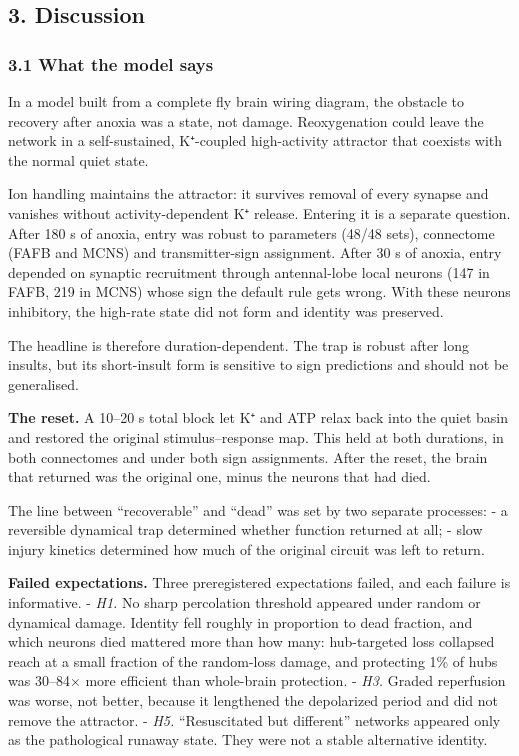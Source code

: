 \documentclass[11pt]{article}
\begin{document}
\subsection{3. Discussion}\label{discussion}

\subsubsection{3.1 What the model says}\label{what-the-model-says}

In a model built from a complete fly brain wiring diagram, the obstacle to recovery after anoxia was a state, not damage. Reoxygenation could leave the network in a self-sustained, K⁺-coupled high-activity attractor that coexists with the normal quiet state.

Ion handling maintains the attractor: it survives removal of every synapse and vanishes without activity-dependent K⁺ release. Entering it is a separate question. After 180 s of anoxia, entry was robust to parameters (48/48 sets), connectome (FAFB and MCNS) and transmitter-sign assignment. After 30 s of anoxia, entry depended on synaptic recruitment through antennal-lobe local neurons (147 in FAFB, 219 in MCNS) whose sign the default rule gets wrong. With these neurons inhibitory, the high-rate state did not form and identity was preserved.

The headline is therefore duration-dependent. The trap is robust after long insults, but its short-insult form is sensitive to sign predictions and should not be generalised.

\textbf{The reset.} A 10--20 s total block let K⁺ and ATP relax back into the quiet basin and restored the original stimulus--response map. This held at both durations, in both connectomes and under both sign assignments. After the reset, the brain that returned was the original one, minus the neurons that had died.

The line between ``recoverable'' and ``dead'' was set by two separate processes:
- a reversible dynamical trap determined whether function returned at all;
- slow injury kinetics determined how much of the original circuit was left to return.

\textbf{Failed expectations.} Three preregistered expectations failed, and each failure is informative.
- \emph{H1.} No sharp percolation threshold appeared under random or dynamical damage. Identity fell roughly in proportion to dead fraction, and which neurons died mattered more than how many: hub-targeted loss collapsed reach at a small fraction of the random-loss damage, and protecting 1\% of hubs was 30--84× more efficient than whole-brain protection.
- \emph{H3.} Graded reperfusion was worse, not better, because it lengthened the depolarized period and did not remove the attractor.
- \emph{H5.} ``Resuscitated but different'' networks appeared only as the pathological runaway state. They were not a stable alternative identity.
\end{document}

